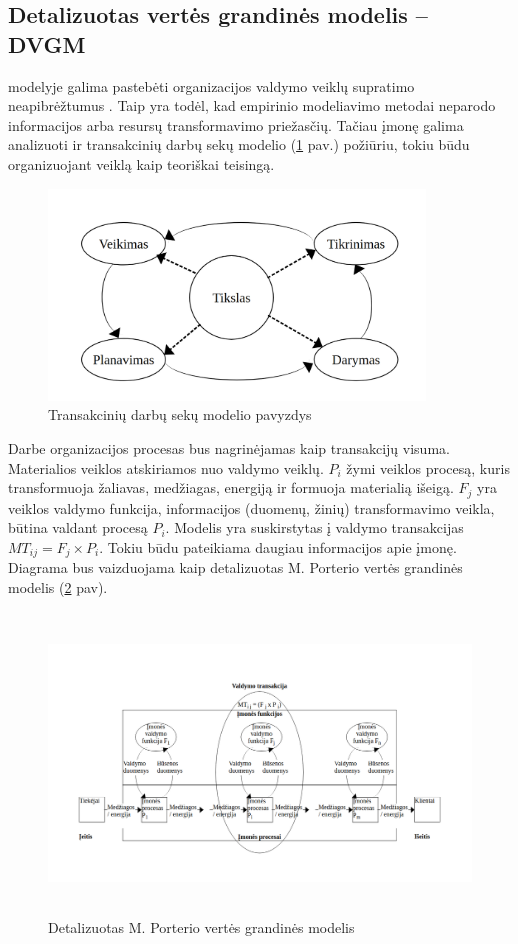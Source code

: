 \subsection{Detalizuotas vertės grandinės modelis – DVGM} \label{section:dvcm}

\BPMN{} modelyje galima pastebėti organizacijos valdymo veiklų supratimo neapibrėžtumus \cite{bpmnPorterModel}. Taip yra todėl, kad empirinio modeliavimo metodai neparodo informacijos arba resursų transformavimo priežasčių. Tačiau įmonę galima analizuoti ir transakcinių darbų sekų modelio (\ref{img:pdca} pav.) požiūriu, tokiu būdu organizuojant veiklą kaip teoriškai teisingą.

\begin{figure}[H]
	\centering
	\includegraphics[width=10cm]{img/pdca}
	\caption{Transakcinių darbų sekų modelio pavyzdys}
	\label{img:pdca}
\end{figure}

Darbe organizacijos procesas bus nagrinėjamas kaip transakcijų visuma. Materialios
veiklos atskiriamos nuo valdymo veiklų. $P_i$ žymi veiklos procesą, kuris
transformuoja žaliavas, medžiagas, energiją ir formuoja materialią išeigą.
$F_j$ yra veiklos valdymo funkcija, informacijos (duomenų, žinių) transformavimo
veikla, būtina valdant procesą $P_i$. Modelis yra suskirstytas į valdymo
transakcijas $ MT_{ij} = F_j \times P_i$. Tokiu būdu pateikiama daugiau
informacijos apie įmonę. Diagrama bus vaizduojama kaip detalizuotas M.
Porterio vertės grandinės modelis (\ref{img:detalized_porter_vcm} pav).

\begin{figure}[H]
	\centering
	\includegraphics[height=8cm]{img/detalized_porter_vcm}
	\caption{Detalizuotas M. Porterio vertės grandinės modelis}
	\label{img:detalized_porter_vcm}
\end{figure}


